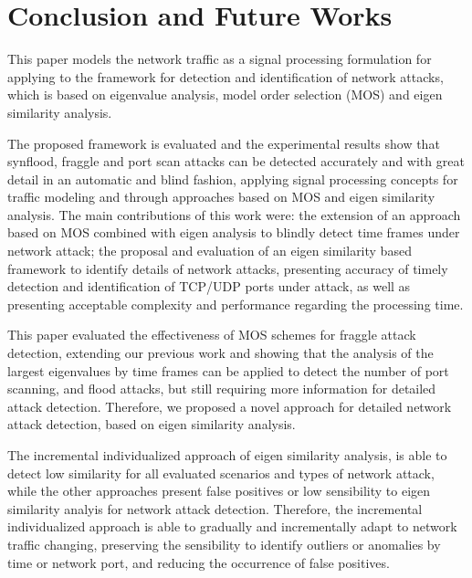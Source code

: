 \documentclass[review]{elsarticle}
\begin{document}
\section{Conclusion and Future Works}
\label{sec:conclusionandfutureworks}

This paper models the network traffic as a signal processing formulation for applying to the framework for detection and identification of network attacks, which is based on eigenvalue analysis, model order selection (MOS) and eigen similarity analysis.

The proposed framework is evaluated and the experimental results show that synflood, fraggle and port scan attacks can be detected accurately and with great detail in an automatic and blind fashion, applying signal processing concepts for traffic modeling and through approaches based on MOS and eigen similarity analysis. The main contributions of this work were: the extension of an approach based on MOS combined with eigen analysis to blindly detect time frames under network attack; the proposal and evaluation of an eigen similarity based framework to identify details of network attacks, presenting accuracy of timely detection and identification of TCP/UDP ports under attack, as well as presenting acceptable complexity and performance regarding the processing time.

This paper evaluated the effectiveness of MOS schemes for fraggle attack detection, extending our previous work \cite{tenorio2013greatest} and showing that the analysis of the largest eigenvalues by time frames can be applied to detect the number of port scanning, and flood attacks, but still requiring more information for detailed attack detection. Therefore, we proposed a novel approach for detailed network attack detection, based on eigen similarity analysis.

The incremental individualized approach of eigen similarity analysis, is able to detect low similarity for all evaluated scenarios and types of network attack, while the other approaches present false positives or low sensibility to eigen similarity analyis for network attack detection. Therefore, the incremental individualized approach is able to gradually and incrementally adapt to network traffic changing, preserving the sensibility to identify outliers or anomalies by time or network port, and reducing the occurrence of false positives.
\end{document}
